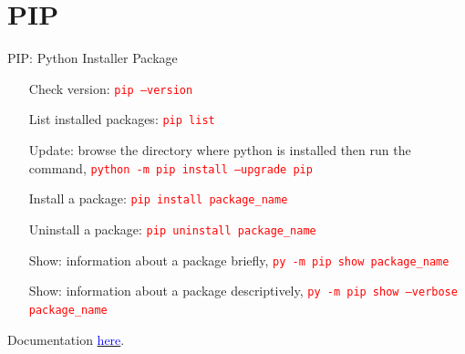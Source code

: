 \documentclass[11 pt, letterpaper]{report}
\newcommand{\R}{\textcolor{red}}
\newcommand{\T}{\texttt}
\begin{document}
\pagebreak

\section*{PIP}
PIP: Python Installer Package \\
\begin{enumerate}
	\item[Check version:] \R{\T{pip --version}}
	\item [List installed packages:] \R{\T{pip list}}
	\item[Update:] browse the directory where python is installed then run the command, \R{\T{python -m pip install --upgrade pip}}
	\item [Install a package:] \R{\T{pip install package\_name}}
	\item [Uninstall a package:] \R{\T{pip uninstall package\_name}}
	\item[Show:] information about a package briefly, \R{\T{py -m pip show package\_name}}
	\item[Show:] information about a package descriptively, \R{\T{py -m pip show --verbose package\_name}}
\end{enumerate}
Documentation \href{https://pip.pypa.io/en/stable/}{\textcolor{blue}{here}}.
\end{document}
